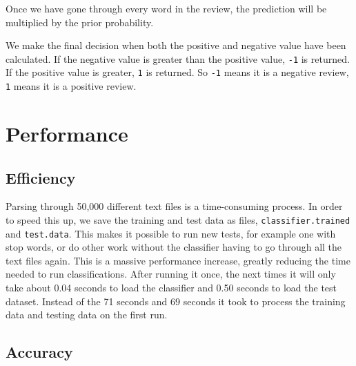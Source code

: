 \documentclass[a4paper,12pt]{article}
\begin{document}
 Once we have gone through every word in the review, the prediction will be multiplied by the prior probability.
 
 We make the final decision when both the positive and negative value have been calculated. If the negative value is greater than the positive value, \texttt{-1} is returned. If the positive value is greater, \texttt{1} is returned. So \texttt{-1} means it is a negative review, \texttt{1} means it is a positive review.

\section{Performance}
\subsection{Efficiency}

Parsing through 50,000 different text files is a time-consuming process. In order to speed this up, we save the training and test data as files, \texttt{classifier.trained} and \texttt{test.data}. This makes it possible to run new tests, for example one with stop words, or do other work without the classifier having to go through all the text files again. This is a massive performance increase, greatly reducing the time needed to run classifications. After running it once, the next times it will only take about 0.04 seconds to load the classifier and 0.50 seconds to load the test dataset. Instead of the 71 seconds and 69 seconds it took to process the training data and testing data on the first run.

\subsection{Accuracy}
\end{document}
